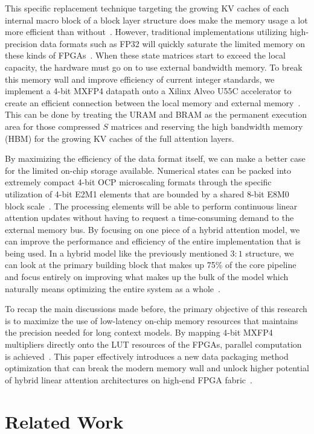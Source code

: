 \documentclass[conference]{IEEEtran}
\begin{document}
This specific replacement technique targeting the growing KV caches of each internal macro block of a block layer structure does make the memory usage a lot more efficient than without~\cite{b10}. However, traditional implementations utilizing high-precision data formats such as FP32 will quickly saturate the limited memory on these kinds of FPGAs~\cite{b10}. When these state matrices start to exceed the local capacity, the hardware must go on to use external bandwidth memory. To break this memory wall and improve efficiency of current integer standards, we implement a 4-bit MXFP4 datapath onto a Xilinx Alveo U55C accelerator to create an efficient connection between the local memory and external memory~\cite{b5}. This can be done by treating the URAM and BRAM as the permanent execution area for those compressed $S$ matrices and reserving the high bandwidth memory (HBM) for the growing KV caches of the full attention layers.

By maximizing the efficiency of the data format itself, we can make a better case for the limited on-chip storage available. Numerical states can be packed into extremely compact 4-bit OCP microscaling formats through the specific utilization of 4-bit E2M1 elements that are bounded by a shared 8-bit E8M0 block scale~\cite{b12}. The processing elements will be able to perform continuous linear attention updates without having to request a time-consuming demand to the external memory bus. By focusing on one piece of a hybrid attention model, we can improve the performance and efficiency of the entire implementation that is being used. In a hybrid model like the previously mentioned $3:1$ structure, we can look at the primary building block that makes up 75\% of the core pipeline and focus entirely on improving what makes up the bulk of the model which naturally means optimizing the entire system as a whole~\cite{b9}.

To recap the main discussions made before, the primary objective of this research is to maximize the use of low-latency on-chip memory resources that maintains the precision needed for long context models. By mapping 4-bit MXFP4 multipliers directly onto the LUT resources of the FPGAs, parallel computation is achieved~\cite{b12}. This paper effectively introduces a new data packaging method optimization that can break the modern memory wall and unlock higher potential of hybrid linear attention architectures on high-end FPGA fabric~\cite{b5}.

\section{Related Work}
\end{document}
